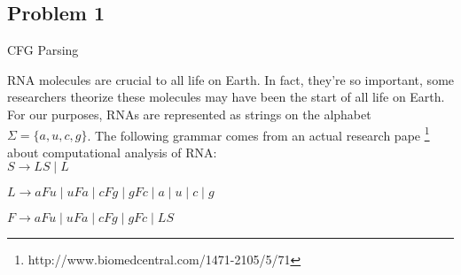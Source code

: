 \documentclass{article}
\begin{document}
    \subsection*{Problem 1}
    CFG Parsing

    RNA molecules are crucial to all life on Earth.  In fact, they're so important, some
    researchers theorize these molecules may have been the start of all life on Earth. For our
    purposes, RNAs are represented as strings on the alphabet $\Sigma=\{a,u,c,g\}$.  The following 
    grammar comes from an actual research pape
    \footnote{http://www.biomedcentral.com/1471-2105/5/71} about computational analysis of RNA: \\

    $S \rightarrow LS \;|\; L$

    $L \rightarrow aFu \;|\; uFa \;|\; cFg \;|\; gFc \;|\; a \;|\; u \;|\; c \;|\; g$

    $F \rightarrow aFu \;|\; uFa \;|\; cFg \;|\; gFc \;|\; LS$
\end{document}
